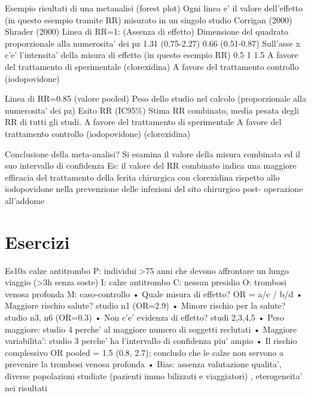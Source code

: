 \documentclass[]{book}
\begin{document}
Esempio risultati di una metanalisi (forest plot)
Ogni linea e' il valore dell'effetto (in questo esempio tramite RR) misurato in un singolo studio
Corrigan (2000)
Shrader (2000)
Linea di RR=1: (Assenza di effetto)
Dimensione del quadrato proporzionale alla numerosita' dei pz
1.31 (0.75-2.27)
0.66 (0.51-0.87)
Sull'asse x c'e' l'intensita' della misura di effetto (in questo esempio RR)
0.5
1
1.5
A favore del trattamento di sperimentale (clorexidina)
A favore del trattamento controllo (iodopovidone)

Linea di RR=0.85 (valore pooled)
Peso dello studio nel calcolo (proporzionale alla numerosita' dei pz)
Esito RR (IC95\%)
Stima RR combinato, media pesata degli RR di tutti gli studi.
A favore del trattamento di sperimentale
A favore del trattamento controllo (iodopovidone)
(clorexidina)

Conclusione della meta-analisi?
Si esamina il valore della misura combinata ed il suo intervallo di confidenza
Es: il valore del RR combinato indica una maggiore efficacia del trattamento della ferita chirurgica con clorexidina rispetto allo iodopovidone nella prevenzione delle infezioni del sito chirurgico post- operazione all'addome

\hypertarget{esercizi-4}{%
\section{Esercizi}\label{esercizi-4}}

Es10a calze antitrombo
P: individui \textgreater{}75 anni che devono affrontare un lungo viaggio (\textgreater{}3h senza soste)
I: calze antitrombo
C: nessun presidio
O: trombosi venosa profonda M: caso-controllo
• Quale misura di effetto? OR = a/c / b/d
• Maggiore rischio salute? studio n1 (OR=2.9)
• Minore rischio per la salute? studio n3, n6 (OR=0.3)
• Non c'e' evidenza di effetto? studi 2,3,4,5
• Peso maggiore: studio 4 perche' al maggiore numero di soggetti reclutati
• Maggiore variabilita': studio 3 perche' ha l'intervallo di confidenza piu' ampio
• Il rischio complessivo OR pooled = 1.5 (0.8, 2.7); concludo che le calze non servono a prevenire la trombosi venosa profonda
• Bias: assenza valutazione qualita', diverse popolazioni studiate (pazienti immo
bilizzati e viaggiatori) , eterogeneita' nei risultati
\end{document}
